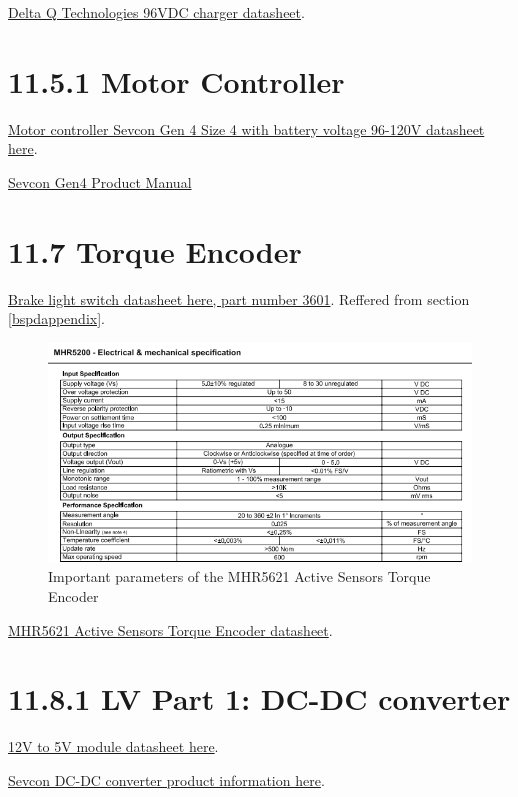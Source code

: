 \documentclass{article}
\begin{document}
\href{http://delta-q.com/wp-content/uploads/2015/12/Delta-Q_QuiQ1000_BatteryCharger_Specifications.pdf}{Delta Q Technologies 96VDC charger datasheet}.

\section*{11.5.1 Motor Controller}

\href{http://www.sevcon.com/media/2461/Gen4\%20Aug\%202013\%20web.pdf}{Motor controller Sevcon Gen 4 Size 4 with battery voltage 96-120V datasheet here}. 

\href{http://www.thunderstruck-ev.com/Manuals/Gen4_Product_Manual_V3.0.pdf}{Sevcon Gen4 Product Manual}

\section*{11.7 Torque Encoder} \label{torqueappendix}

\href{https://www.pegasusautoracing.com/2015/086.pdf}{Brake light switch datasheet here, part number 3601}. Reffered from section \ref{bspdappendix}.

\begin{figure}[H]
    \centering
    \includegraphics[width = 0.6 \textwidth]{activesensorsnip}
    \caption{Important parameters of the MHR5621 Active Sensors Torque Encoder}
    \label{torquesnip}
\end{figure}

\href{http://www.magni-tec.com/datasheet/WS-MHR5200.pdf}{MHR5621 Active Sensors Torque Encoder datasheet}.

\section*{11.8.1 LV Part 1: DC-DC converter}

\href{https://www.superbrightleds.com/moreinfo/bar-strip-accessories/12vdc-to-5vdc-voltage-converter-/1549/3652/#/tab/Specifications}{12V to 5V module datasheet here}.

\href{http://www.evdrives.com/product_p/vr-sevcon-7213.htm}{Sevcon DC-DC converter product information here}.
\end{document}
